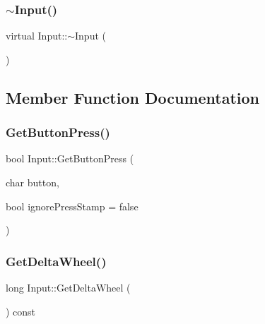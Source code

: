 \hypertarget{class_input_a230646fa6e6433b4d9ac3535b7d52087}{}\label{class_input_a230646fa6e6433b4d9ac3535b7d52087} 
\subsubsection{\texorpdfstring{$\sim$\+Input()}{~Input()}}
{\footnotesize\ttfamily virtual Input\+::$\sim$\+Input (\begin{DoxyParamCaption}{ }\end{DoxyParamCaption})\hspace{0.3cm}{\ttfamily [virtual]}}



\subsection{Member Function Documentation}
\hypertarget{class_input_ad7f07b1c067eb0d7107359dce7676b96}{}\label{class_input_ad7f07b1c067eb0d7107359dce7676b96} 
\subsubsection{\texorpdfstring{Get\+Button\+Press()}{GetButtonPress()}}
{\footnotesize\ttfamily bool Input\+::\+Get\+Button\+Press (\begin{DoxyParamCaption}\item[{char}]{button,  }\item[{bool}]{ignore\+Press\+Stamp = {\ttfamily false} }\end{DoxyParamCaption})}

\hypertarget{class_input_a98f464509993520aec2dad1b6eab4845}{}\label{class_input_a98f464509993520aec2dad1b6eab4845} 
\subsubsection{\texorpdfstring{Get\+Delta\+Wheel()}{GetDeltaWheel()}}
{\footnotesize\ttfamily long Input\+::\+Get\+Delta\+Wheel (\begin{DoxyParamCaption}{ }\end{DoxyParamCaption}) const}

\hypertarget{class_input_aa94c7181f990a4c7be6c82fb4a3bd382}{}\label{class_input_aa94c7181f990a4c7be6c82fb4a3bd382} 
